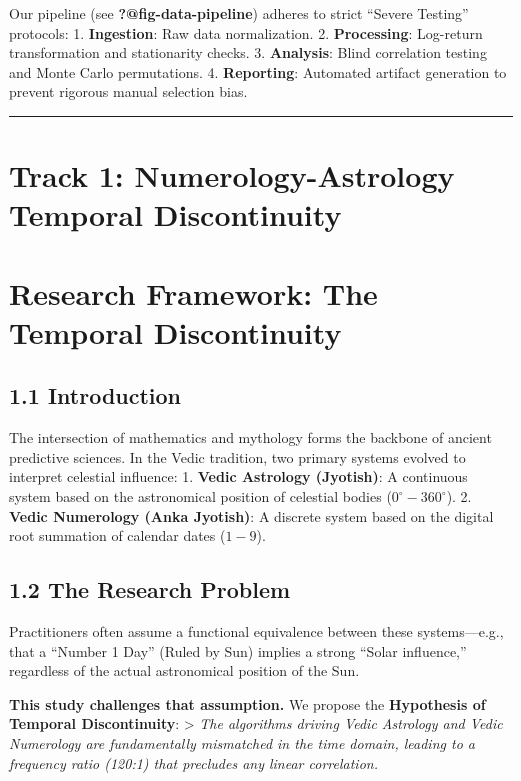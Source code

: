\documentclass[
  11pt,
  a4paper,
  oneside,
  openany]{report}
\begin{document}
Our pipeline (see \textbf{?@fig-data-pipeline}) adheres to strict
``Severe Testing'' protocols: 1. \textbf{Ingestion}: Raw data
normalization. 2. \textbf{Processing}: Log-return transformation and
stationarity checks. 3. \textbf{Analysis}: Blind correlation testing and
Monte Carlo permutations. 4. \textbf{Reporting}: Automated artifact
generation to prevent rigorous manual selection bias.

\begin{center}\rule{0.5\linewidth}{0.5pt}\end{center}

\chapter{Track 1: Numerology-Astrology Temporal
Discontinuity}\label{track-1-numerology-astrology-temporal-discontinuity}

\chapter{Research Framework: The Temporal
Discontinuity}\label{research-framework-the-temporal-discontinuity}

\section{1.1 Introduction}\label{introduction-1}

The intersection of mathematics and mythology forms the backbone of
ancient predictive sciences. In the Vedic tradition, two primary systems
evolved to interpret celestial influence: 1. \textbf{Vedic Astrology
(Jyotish)}: A continuous system based on the astronomical position of
celestial bodies (\(0^\circ-360^\circ\)). 2. \textbf{Vedic Numerology
(Anka Jyotish)}: A discrete system based on the digital root summation
of calendar dates (\(1-9\)).

\section{1.2 The Research Problem}\label{the-research-problem}

Practitioners often assume a functional equivalence between these
systems---e.g., that a ``Number 1 Day'' (Ruled by Sun) implies a strong
``Solar influence,'' regardless of the actual astronomical position of
the Sun.

\textbf{This study challenges that assumption.} We propose the
\textbf{Hypothesis of Temporal Discontinuity}: \textgreater{} \emph{The
algorithms driving Vedic Astrology and Vedic Numerology are
fundamentally mismatched in the time domain, leading to a frequency
ratio (120:1) that precludes any linear correlation.}
\end{document}
